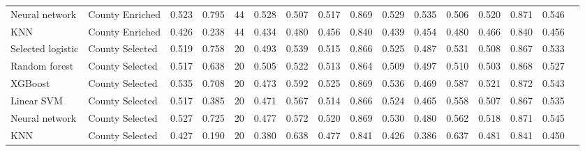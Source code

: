 \begin{table}[H]
{\begin{tabular}{lllccccccccccccc}
Neural network & County Enriched & 0.523 & 0.795 & 44 & 0.528 & 0.507 & 0.517 & 0.869 & 0.529 & 0.535 & 0.506 & 0.520 & 0.871 & 0.546 \\
KNN & County Enriched & 0.426 & 0.238 & 44 & 0.434 & 0.480 & 0.456 & 0.840 & 0.439 & 0.454 & 0.480 & 0.466 & 0.840 & 0.456 \\
Selected logistic & County Selected & 0.519 & 0.758 & 20 & 0.493 & 0.539 & 0.515 & 0.866 & 0.525 & 0.487 & 0.531 & 0.508 & 0.867 & 0.533 \\
Random forest & County Selected & 0.517 & 0.638 & 20 & 0.505 & 0.522 & 0.513 & 0.864 & 0.509 & 0.497 & 0.510 & 0.503 & 0.868 & 0.527 \\
XGBoost & County Selected & 0.535 & 0.708 & 20 & 0.473 & 0.592 & 0.525 & 0.869 & 0.536 & 0.469 & 0.587 & 0.521 & 0.872 & 0.543 \\
Linear SVM & County Selected & 0.517 & 0.385 & 20 & 0.471 & 0.567 & 0.514 & 0.866 & 0.524 & 0.465 & 0.558 & 0.507 & 0.867 & 0.535 \\
Neural network & County Selected & 0.527 & 0.725 & 20 & 0.477 & 0.572 & 0.520 & 0.869 & 0.530 & 0.480 & 0.562 & 0.518 & 0.871 & 0.545 \\
KNN & County Selected & 0.427 & 0.190 & 20 & 0.380 & 0.638 & 0.477 & 0.841 & 0.426 & 0.386 & 0.637 & 0.481 & 0.841 & 0.450 \\
\bottomrule
\end{tabular}}
\end{table}

